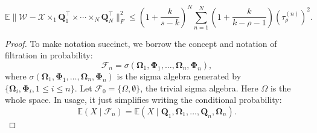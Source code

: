 \begin{lem}
\label{lemma:probabilistic_err_linkage_tensor}
\begin{equation}
\mathbb{E} \|\mathscr{W} - \mathscr{X}\times_1 \mathbf{Q}_1^\top \times \cdots \times_N \mathbf{Q}_N^\top\|_F^2\le 
\left(1+\frac{k}{s-k}\right)^N  \sum_{n=1}^N \left(1+\frac{k}{k-\rho-1}\right)(\tau^{(n)}_\rho)^2. 
\end{equation}
\begin{proof}
To make notation succinct, we borrow the concept and notation of filtration in probability:
\begin{equation}
\mathcal{F}_n = \sigma(\mathbf{\Omega}_1, \mathbf{\Phi}_1, \dots, \mathbf{\Omega}_n, \mathbf{\Phi}_n), 
\end{equation}
where $\sigma(\mathbf{\Omega}_1, \mathbf{\Phi}_1, \dots, \mathbf{\Omega}_n, \mathbf{\Phi}_n)$ is the sigma algebra generated by $\{\mathbf{\Omega}_i, \mathbf{\Phi}_i, 1\le i\le n\}$. Let $\mathcal{F}_0 = \{\Omega, \emptyset\}$,  the trivial sigma algebra. Here $\Omega$ is the whole space. In usage, it just simplifies writing the conditional probability:
\begin{equation}
\mathbb{E} (X \mid \mathcal{F}_n) = \mathbb{E} (X\mid \mathbf{Q}_1,\mathbf{\Omega}_1, \dots, \mathbf{Q}_n,\mathbf{\Omega}_n). 
\end{equation}


\end{proof}
\end{lem}
